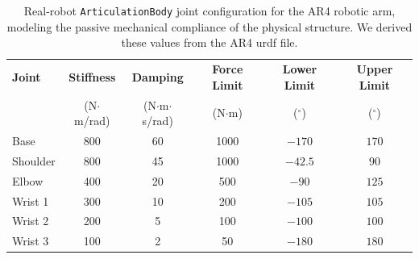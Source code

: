 \begin{table}[t]
	\centering
	\begin{tabular}{lccccc}
		\hline
		\textbf{Joint}       & \textbf{Stiffness}   & \textbf{Damping}        &
		\textbf{Force Limit} & \textbf{Lower Limit} & \textbf{Upper Limit}                                            \\
		                     & (N$\cdot$m/rad)      & (N$\cdot$m$\cdot$s/rad) & (N$\cdot$m) & ($^\circ$) & ($^\circ$) \\
		\hline
		Base                 & 800                  & 60                      & 1000        & $-170$     & $170$      \\
		Shoulder             & 800                  & 45                      & 1000        & $-42.5$    & $90$       \\
		Elbow                & 400                  & 20                      & 500         & $-90$      & $125$      \\
		Wrist 1              & 300                  & 10                      & 200         & $-105$     & $105$      \\
		Wrist 2              & 200                  & 5                       & 100         & $-100$     & $100$      \\
		Wrist 3              & 100                  & 2                       & 50          & $-180$     & $180$      \\
		\hline
	\end{tabular}
	\caption{Real-robot \texttt{ArticulationBody} joint configuration for the AR4 robotic arm, modeling the passive mechanical compliance of the physical structure. We derived these values from the AR4 \gls{urdf} file.}
	\label{tab:real_joint_config}
\end{table}

